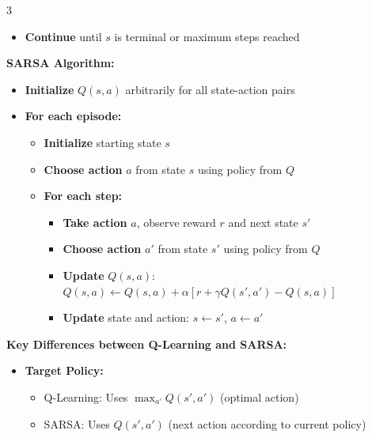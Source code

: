 \documentclass[10pt,landscape]{article}
\begin{document}
\begin{multicols}{3}
\begin{tcolorbox}[breakable, title=Reinforcement Learning, colback=rl, boxsep=1pt, left=1pt, right=1pt, top=1pt, bottom=1pt]
\begin{itemize}[leftmargin=*,noitemsep,topsep=0pt]
\begin{itemize}[noitemsep]
        \item \textbf{Continue} until $s$ is terminal or maximum steps reached
    \end{itemize}
\end{itemize}

\textbf{SARSA Algorithm:}
\begin{itemize}[leftmargin=*,noitemsep,topsep=0pt]
    \item \textbf{Initialize} $Q(s,a)$ arbitrarily for all state-action pairs
    
    \item \textbf{For each episode:}
    \begin{itemize}[noitemsep]
        \item \textbf{Initialize} starting state $s$
        
        \item \textbf{Choose action} $a$ from state $s$ using policy from $Q$
        
        \item \textbf{For each step:}
        \begin{itemize}[noitemsep]
            \item \textbf{Take action} $a$, observe reward $r$ and next state $s'$
            
            \item \textbf{Choose action} $a'$ from state $s'$ using policy from $Q$
            
            \item \textbf{Update} $Q(s,a)$:
            $Q(s,a) \leftarrow Q(s,a) + \alpha [r + \gamma Q(s',a') - Q(s,a)]$
            
            \item \textbf{Update} state and action: $s \leftarrow s'$, $a \leftarrow a'$
        \end{itemize}
    \end{itemize}
\end{itemize}

\textbf{Key Differences between Q-Learning and SARSA:}
\begin{itemize}[leftmargin=*,noitemsep,topsep=0pt]
    \item \textbf{Target Policy:}
    \begin{itemize}[noitemsep]
        \item Q-Learning: Uses $\max_{a'} Q(s',a')$ (optimal action)
        \item SARSA: Uses $Q(s',a')$ (next action according to current policy)
    \end{itemize}
    

\end{itemize}
\end{tcolorbox}
\end{multicols}
\end{document}
